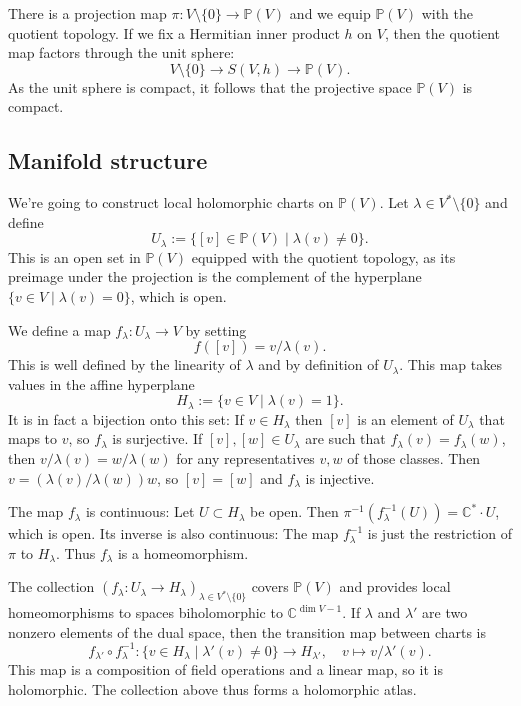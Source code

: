 \documentclass[11pt]{article}
\theoremstyle{definition}
\newcommand{\kk}[1]{\mathbb{#1}}
\begin{document}
There is a projection map $\pi : V \setminus \{0\} \to \kk P(V)$ and we equip $\kk P(V)$ with the quotient topology. If we fix a Hermitian inner product $h$ on $V$, then the quotient map factors through the unit sphere:
$$
V \setminus \{0\} \to S(V, h) \to \kk P(V).
$$
As the unit sphere is compact, it follows that the projective space $\kk P(V)$ is compact.


\subsection{Manifold structure}

We're going to construct local holomorphic charts on $\kk P(V)$. Let $\lambda \in V^* \setminus \{0\}$ and define
$$
U_\lambda := \{ [v] \in \kk P(V) \mid \lambda(v) \not= 0 \}.
$$
This is an open set in $\kk P(V)$ equipped with the quotient topology, as its preimage under the projection is the complement of the hyperplane $\{v \in V \mid \lambda(v) = 0\}$, which is open.

We define a map $f_\lambda: U_\lambda \to V$ by setting
$$
f([v]) = v/\lambda(v).
$$
This is well defined by the linearity of $\lambda$ and by definition of $U_\lambda$. This map takes values in the affine hyperplane
$$
H_\lambda := \{ v \in V \mid \lambda(v) = 1 \}.
$$
It is in fact a bijection onto this set: If $v \in H_\lambda$ then $[v]$ is an element of $U_\lambda$ that maps to $v$, so $f_\lambda$ is surjective. If $[v], [w] \in U_\lambda$ are such that $f_\lambda(v) = f_\lambda(w)$, then $v/\lambda(v) = w/\lambda(w)$ for any representatives $v, w$ of those classes. Then $v = (\lambda(v)/\lambda(w)) w$, so $[v] = [w]$ and $f_\lambda$ is injective.

The map $f_\lambda$ is continuous: Let $U \subset H_\lambda$ be open. Then $\pi^{-1}(f_\lambda^{-1}(U)) = \kk C^* \cdot U$, which is open. Its inverse is also continuous: The map $f_\lambda^{-1}$ is just the restriction of $\pi$ to $H_\lambda$. Thus $f_\lambda$ is a homeomorphism.

The collection $(f_\lambda : U_\lambda \to H_\lambda)_{\lambda \in V^* \setminus \{0\}}$ covers $\kk P(V)$ and provides local homeomorphisms to spaces biholomorphic to $\kk C^{\dim V - 1}$. If $\lambda$ and $\lambda'$ are two nonzero elements of the dual space, then the transition map between charts is
$$
f_{\lambda'} \circ f_{\lambda}^{-1} : \{v \in H_\lambda \mid \lambda'(v) \not= 0 \} \to H_{\lambda'},
\quad
v \mapsto v/\lambda'(v).
$$
This map is a composition of field operations and a linear map, so it is holomorphic. The collection above thus forms a holomorphic atlas.
\end{document}
